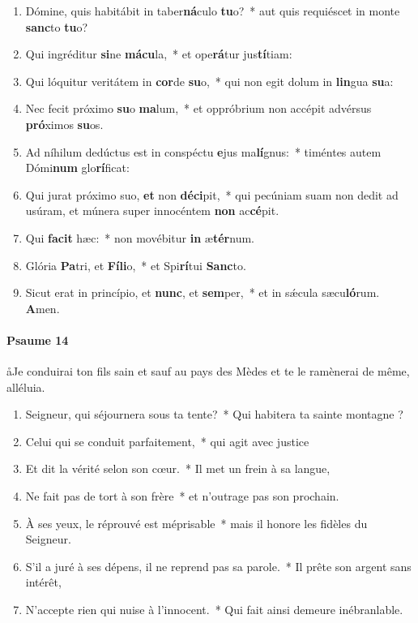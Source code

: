 \documentclass[twoside]{article}
\begin{document}
\begin{paracol}[1]{2}
\begin{enumerate}[wide, itemsep=0mm, labelwidth=!, labelindent=0pt, label=\color{gregoriocolor}\theenumi]
\item Dómine, quis habitábit in taber\textbf{ná}culo \textbf{tu}o?~* aut quis requiéscet in monte \textbf{sanc}to \textbf{tu}o?
\item Qui ingréditur \textbf{si}ne \textbf{má}\textbf{cu}la,~* et ope\textbf{rá}tur jus\textbf{tí}tiam:
\item Qui lóquitur veritátem in \textbf{cor}de \textbf{su}o,~* qui non egit dolum in \textbf{lin}gua \textbf{su}a:
\item Nec fecit próximo \textbf{su}o \textbf{ma}lum,~* et oppróbrium non accépit advérsus \textbf{pró}ximos \textbf{su}os.
\item Ad níhilum dedúctus est in conspéctu \textbf{e}jus ma\textbf{lí}gnus:~* timéntes autem Dómi\textbf{num} glo\textbf{rí}ficat:
\item Qui jurat próximo suo, \textbf{et} non \textbf{dé}\textbf{ci}pit,~* qui pecúniam suam non dedit ad usúram, et múnera super innocéntem \textbf{non} ac\textbf{cé}pit.
\item Qui \textbf{fa}\textbf{cit} hæc:~* non movébitur \textbf{in} æ\textbf{tér}num.
\item Glória \textbf{Pa}tri, et \textbf{Fí}\textbf{li}o,~* et Spi\textbf{rí}tui \textbf{Sanc}to.
\item Sicut erat in princípio, et \textbf{nunc}, et \textbf{sem}per,~* et in sǽcula sæcu\textbf{ló}rum. \textbf{A}men.
\end{enumerate}

\switchcolumn

\paragraph{Psaume 14}
\aa Je conduirai ton fils sain et sauf au pays des Mèdes et te le ramènerai de même, alléluia.


\begin{enumerate}[wide, itemsep=0mm, labelwidth=!, labelindent=0pt, label=\color{gregoriocolor}\theenumi]
\item Seigneur, qui séjournera sous ta tente?~* Qui habitera ta sainte montagne ?
\item Celui qui se conduit parfaitement,~* qui agit avec justice 
\item Et dit la vérité selon son cœur.~* Il met un frein à sa langue,
\item Ne fait pas de tort à son frère~* et n'outrage pas son prochain.
\item À ses yeux, le réprouvé est méprisable~* mais il honore les fidèles du Seigneur.
\item S'il a juré à ses dépens, il ne reprend pas sa parole.~* Il prête son argent sans intérêt,
\item N'accepte rien qui nuise à l'innocent.~* Qui fait ainsi demeure inébranlable.
\end{enumerate}


\end{paracol}
\end{document}
